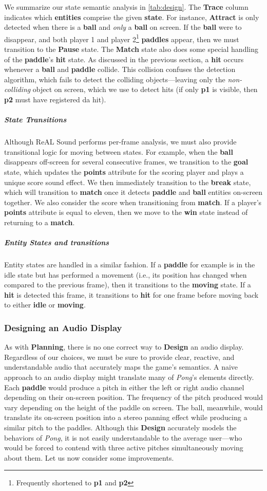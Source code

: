 \documentclass{report}
\newcommand{\rs}{ReAL Sound\xspace}
\newcommand{\plan}{\textbf{Planning}\xspace}
\newcommand{\design}{\textbf{Design}\xspace}
\newcommand{\state}[1]{\textbf{#1}}
\newcommand{\pad}{\textbf{paddle}\xspace}
\newcommand{\ball}{\textbf{ball}\xspace}
\newcommand{\tech}[1]{\textbf{#1}}
\begin{document}
We summarize our state semantic analysis in \cref{tab:design}. The \state{Trace} column indicates which \state{entities} comprise the given \state{state}. For instance, \state{Attract} is only detected when there is a \ball and \emph{only} a \ball on screen. If the \ball were to disappear, and both player 1 and player 2\footnote{Frequently shortened to \state{p1} and \state{p2}} \state{paddles} appear, then we must transition to the \state{Pause} state. The \state{Match} state also does some special handling of the \pad's \state{hit} state. As discussed in the previous section, a \state{hit} occurs whenever a \ball and \pad collide. This collision confuses the detection algorithm, which fails to detect the colliding objects---leaving only the \emph{non-colliding} object on screen, which we use to detect hits (if only \state{p1} is visible, then \state{p2} must have registered da hit).  

\subparagraph{State Transitions}
Although \rs performs per-frame analysis, we must also provide transitional logic for moving between states. For example, when the \ball disappears off-screen for several consecutive frames, we transition to the \state{goal} state, which updates the \tech{points} attribute for the scoring player and plays a unique score sound effect. We then immediately transition to the \state{break} state, which will transition to \state{match} once it detects \pad and \ball entities on-screen together. We also consider the score when transitioning from \state{match}. If a player's \state{points} attribute is equal to eleven, then we move to the \state{win} state instead of returning to a \state{match}.

\subparagraph{Entity States and transitions}
Entity states are handled in a similar fashion. If a \pad for example is in the idle state but has performed a movement (i.e., its position has changed when compared to the previous frame), then it transitions to the \state{moving} state. If a \state{hit} is detected this frame, it transitions to \state{hit} for one frame before moving back to either \state{idle} or \state{moving}.


\subsubsection{Designing an Audio Display}
As with \plan, there is no one correct way to \design an audio display. Regardless of our choices, we must be sure to provide clear, reactive, and understandable audio that accurately maps the game's semantics. A naive approach to an audio display might translate many of \emph{Pong}'s elements directly. Each \pad would produce a pitch in either the left or right audio channel depending on their on-screen position. The frequency of the pitch produced would vary depending on the height of the paddle on screen. The ball, meanwhile, would translate its on-screen position into a stereo panning effect while producing a similar pitch to the paddles. Although this \design accurately models the behaviors of \emph{Pong}, it is not easily understandable to the average user---who would be forced to contend with three active pitches simultaneously moving about them. Let us now consider some improvements.
\end{document}
